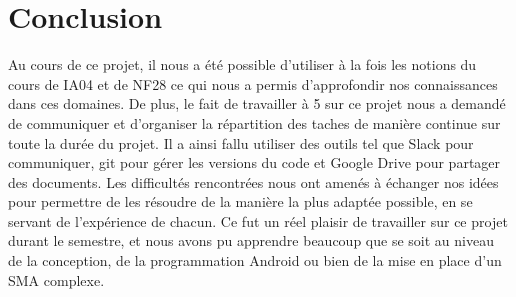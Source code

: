 \documentclass[a4paper,11pt]{article}
\begin{document}



\section{Conclusion}
Au cours de ce projet, il nous a été possible d'utiliser à la fois les notions du cours de IA04 et de NF28 ce qui nous a permis d'approfondir nos connaissances dans ces domaines.
De plus, le fait de travailler à 5 sur ce projet nous a demandé de communiquer et d'organiser la répartition des taches de manière continue sur toute la durée du projet. Il a ainsi fallu utiliser des outils tel que Slack pour communiquer, git pour gérer les versions du code et Google Drive pour partager des documents.
Les difficultés rencontrées nous ont amenés à échanger nos idées pour permettre de les résoudre de la manière la plus adaptée possible, en se servant de l'expérience de chacun.
Ce fut un réel plaisir de travailler sur ce projet durant le semestre, et nous avons pu apprendre beaucoup que se soit au niveau de la conception, de la programmation Android ou bien de la mise en place d'un SMA complexe.
\end{document}
